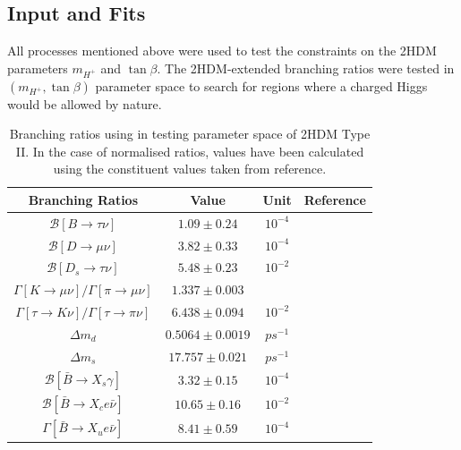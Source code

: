 \documentclass[a4paper,12pt]{article}
\begin{document}
\subsection{Input and Fits}
\label{subsec:fit}
All processes mentioned above were used to test the constraints on the 2HDM parameters $m_{H^+}$ and $\tan\beta$. 
The 2HDM-extended branching ratios were tested in $(m_{H^+},\tan\beta)$ parameter space to search for regions where a charged Higgs would be allowed by nature. 
\begin{table}[ht]
    \centering
    \begin{tabular}{c|ccc}
        \hline\hline
        Branching Ratios & Value & Unit & Reference \\
        \hline\hline
        $\mathcal{B}[B\to\tau\nu]$ & $1.09\pm0.24$ & $10^{-4}$ & \cite{d} \\
        $\mathcal{B}[D\to\mu\nu]$ & $3.82\pm0.33$ & $10^{-4}$ & \cite{d} \\
        $\mathcal{B}[D_s\to\tau\nu]$ & $5.48\pm0.23$ & $10^{-2}$ & \cite{d} \\
        $\Gamma[K\to\mu\nu]/\Gamma[\pi\to\mu\nu]$ & $1.337\pm0.003$ & & \cite{d} \\
        $\Gamma[\tau\to K\nu]/\Gamma[\tau\to\pi\nu]$ & $6.438\pm0.094$ & $10^{-2}$ & \cite{d} \\
        $\Delta m_d$ & $0.5064\pm0.0019$ & $ps^{-1}$ & \cite{c} \\ 
        $\Delta m_s$ & $17.757\pm0.021$ & $ps^{-1}$ & \cite{c} \\
        $\mathcal{B}[\bar{B}\to X_s\gamma]$ & $3.32\pm0.15$ & $10^{-4}$ & \cite{c,f} \\
        $\mathcal{B}[\bar{B}\to X_c e\bar{\nu}]$ & $10.65\pm0.16$ & $10^{-2}$ & \cite{c,d} \\
        $\Gamma[\bar{B}\to X_ue\bar{\nu}]$ & $8.41\pm0.59$ & $10^{-4}$ & \cite{e} \\
        \hline\hline
    \end{tabular}
    \caption{\label{tab:branches}\hspace{-7pt}Branching ratios using in testing parameter space of 2HDM Type II. In the case of normalised ratios, values have been calculated using the constituent values taken from reference.}
\end{table}
\end{document}
